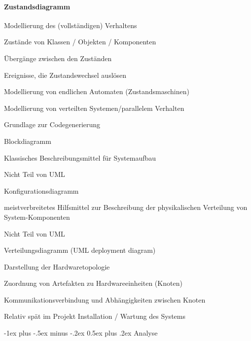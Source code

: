 \documentclass[a4paper]{article}
\makeatletter
\renewcommand{\section}{\@startsection{section}{1}{0mm}%
                                {-1ex plus -.5ex minus -.2ex}%
                                {0.5ex plus .2ex}%
                                {\normalfont\large\bfseries}}
\makeatother
\begin{document}
\begin{multicols}{3}
  \paragraph{Zustandsdiagramm}
  \begin{itemize*}
    \item Modellierung des (vollständigen) Verhaltens
    \begin{itemize*}
      \item Zustände von Klassen / Objekten / Komponenten
      \item Übergänge zwischen den Zuständen
      \item Ereignisse, die Zustandswechsel auslösen
    \end{itemize*}
    \item Modellierung von endlichen Automaten (Zustandsmaschinen)
    \item Modellierung von verteilten Systemen/parallelem Verhalten
    \item Grundlage zur Codegenerierung
  \end{itemize*}

  Blockdiagramm
    \begin{itemize*}
      \item Klassisches Beschreibungsmittel für Systemaufbau
      \item Nicht Teil von UML
    \end{itemize*}
  
    Konfigurationsdiagramm
    \begin{itemize*}
      \item meistverbreitetes Hilfsmittel zur Beschreibung der physikalischen Verteilung von System-Komponenten
      \item Nicht Teil von UML
    \end{itemize*}

    Verteilungsdiagramm (UML deployment diagram)
    \begin{itemize*}
      \item Darstellung der Hardwaretopologie
      \item Zuordnung von Artefakten zu Hardwareeinheiten (Knoten)
      \item Kommunikationsverbindung und Abhängigkeiten zwischen Knoten
      \item Relativ spät im Projekt Installation / Wartung des Systems
    \end{itemize*}

  \newpage
  \section{Analyse}


\end{multicols}
\end{document}
